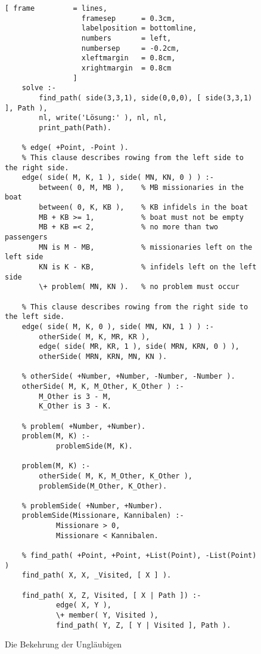 \begin{figure}[!h]
  \centering
\begin{Verbatim}[ frame         = lines, 
                  framesep      = 0.3cm, 
                  labelposition = bottomline,
                  numbers       = left,
                  numbersep     = -0.2cm,
                  xleftmargin   = 0.8cm,
                  xrightmargin  = 0.8cm
                ]
    solve :-
        find_path( side(3,3,1), side(0,0,0), [ side(3,3,1) ], Path ),
        nl, write('Lösung:' ), nl, nl,
        print_path(Path).
    
    % edge( +Point, -Point ).    
    % This clause describes rowing from the left side to the right side.
    edge( side( M, K, 1 ), side( MN, KN, 0 ) ) :-
        between( 0, M, MB ),    % MB missionaries in the boat
        between( 0, K, KB ),    % KB infidels in the boat
        MB + KB >= 1,           % boat must not be empty
        MB + KB =< 2,           % no more than two passengers
        MN is M - MB,           % missionaries left on the left side
        KN is K - KB,           % infidels left on the left side
        \+ problem( MN, KN ).   % no problem must occur
    
    % This clause describes rowing from the right side to the left side.
    edge( side( M, K, 0 ), side( MN, KN, 1 ) ) :-
        otherSide( M, K, MR, KR ),
        edge( side( MR, KR, 1 ), side( MRN, KRN, 0 ) ),
        otherSide( MRN, KRN, MN, KN ).
    
    % otherSide( +Number, +Number, -Number, -Number ).
    otherSide( M, K, M_Other, K_Other ) :-
        M_Other is 3 - M,
        K_Other is 3 - K.
    
    % problem( +Number, +Number).
    problem(M, K) :- 
            problemSide(M, K).
    
    problem(M, K) :-
        otherSide( M, K, M_Other, K_Other ),
        problemSide(M_Other, K_Other).
        
    % problemSide( +Number, +Number).
    problemSide(Missionare, Kannibalen) :- 
            Missionare > 0, 
            Missionare < Kannibalen.
    
    % find_path( +Point, +Point, +List(Point), -List(Point) )
    find_path( X, X, _Visited, [ X ] ).
    
    find_path( X, Z, Visited, [ X | Path ]) :-
            edge( X, Y ),
            \+ member( Y, Visited ),
            find_path( Y, Z, [ Y | Visited ], Path ).
\end{Verbatim}
\vspace*{-0.3cm}
  \caption{Die Bekehrung der Ungläubigen}
  \label{fig:missionare.pl}
\end{figure}      

